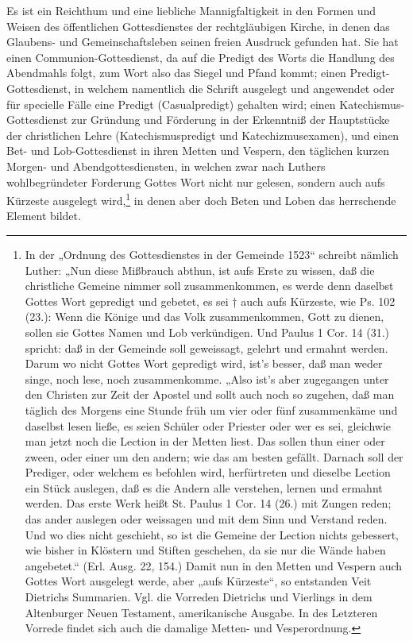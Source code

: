 Es ist ein Reichthum und eine liebliche Mannigfaltigkeit in den Formen und Weisen des öffentlichen Gottesdienstes der rechtgläubigen Kirche, in denen das Glaubens- und Gemeinschaftsleben seinen freien Ausdruck gefunden hat. Sie hat einen Communion-Gottesdienst, da auf die Predigt des Worts die Handlung des Abendmahls folgt, zum Wort also das Siegel und Pfand kommt; einen Predigt-Gottesdienst, in welchem namentlich die Schrift ausgelegt und angewendet oder für specielle Fälle eine Predigt (Casualpredigt) gehalten wird; einen Katechismus-Gottesdienst zur Gründung und Förderung in der Erkenntniß der Hauptstücke der christlichen Lehre (Katechismuspredigt und Katechizmusexamen), und einen Bet- und Lob-Gottesdienst in ihren Metten und Vespern, den täglichen kurzen Morgen- und Abendgottesdiensten, in welchen zwar nach Luthers wohlbegründeter Forderung Gottes Wort nicht nur gelesen, sondern auch aufs Kürzeste ausgelegt wird,\footnote{In der „Ordnung des Gottesdienstes in der Gemeinde 1523“ schreibt nämlich Luther: „Nun diese Mißbrauch abthun, ist aufs Erste zu wissen, daß die christliche Gemeine nimmer soll zusammenkommen, es werde denn daselbst Gottes Wort gepredigt und gebetet, es sei † auch aufs Kürzeste, wie Ps. 102 (23.): Wenn die Könige und das Volk zusammenkommen, Gott zu dienen, sollen sie Gottes Namen und Lob verkündigen. Und Paulus 1 Cor. 14 (31.) spricht: daß in der Gemeinde soll geweissagt, gelehrt und ermahnt werden. Darum wo nicht Gottes Wort gepredigt wird, ist's besser, daß man weder singe, noch lese, noch zusammenkomme. „Also ist's aber zugegangen unter den Christen zur Zeit der Apostel und sollt auch noch so zugehen, daß man täglich des Morgens eine Stunde früh um vier oder fünf zusammenkäme und daselbst lesen ließe, es seien Schüler oder Priester oder wer es sei, gleichwie man jetzt noch die Lection in der Metten liest. Das sollen thun einer oder zween, oder einer um den andern; wie das am besten gefällt. Darnach soll der Prediger, oder welchem es befohlen wird, herfürtreten und dieselbe Lection ein Stück auslegen, daß es die Andern alle verstehen, lernen und ermahnt werden. Das erste Werk heißt St. Paulus 1 Cor. 14 (26.) mit Zungen reden; das ander auslegen oder weissagen und mit dem Sinn und Verstand reden. Und wo dies nicht geschieht, so ist die Gemeine der Lection nichts gebessert, wie bisher in Klöstern und Stiften geschehen, da sie nur die Wände haben angebetet.“ (Erl. Ausg. 22, 154.) Damit nun in den Metten und Vespern auch Gottes Wort ausgelegt werde, aber „aufs Kürzeste“, so entstanden Veit Dietrichs Summarien. Vgl. die Vorreden Dietrichs und Vierlings in dem Altenburger Neuen Testament, amerikanische Ausgabe. In des Letzteren Vorrede findet sich auch die damalige Metten- und Vesperordnung.}  in denen aber doch Beten und Loben das herrschende Element bildet.

